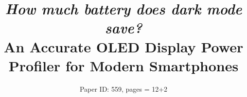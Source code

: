 \documentclass{sig-alternate-10pt}
\begin{document}
\title{
  {\it \LARGE How much battery does dark mode save?}\\
    An Accurate OLED Display Power Profiler
    for Modern Smartphones}



\author{
Paper ID: 559, pages = 12+2
} 


\newcommand{\oldstuff}[1]{}
\newcommand{\yes}{$\checkmark$}
\newcommand{\limited}{Limited}
\newcommand{\no}{$\times$}
\newcommand{\etc}{\emph{etc.}\xspace}
\newcommand{\etcc}{\emph{etc.}}
\newcommand{\ie}{\emph{i.e.,}\xspace}
\newcommand{\eg}{\emph{e.g.,}\xspace}
\newcommand{\etal}{\emph{et al.}\xspace}
\newcommand{\SmallCrunch}{\vspace{-0cm}}
\newcommand{\smallcrunch}{\vspace{-0cm}}

\renewcommand{\paragraph}[1]{\smallskip\noindent{\bf{#1}}}


\newcommand{\questionaj}[1]{{\color{red} \textbf{questionAJ: #1}}}
\newcommand{\updated}[1]{{\color{red} {}}}
\newcommand{\editaj}[2]{{\sout{#1}\color{red} {#2}}}
\newcommand{\removeaj}[2]{{\color{red}{\textbf{Remove following:}}}{\sout{#1}}	{\color{red} {\textbf{Because} #2}}}
\newcommand{\addaj}[1]{{\color{red} {ADD?: #1}}}

\newcommand{\insitu}{{\em in situ}\xspace}

\newcommand{\name}{{\sc PFOP}\xspace}
\newcommand{\namee}{{\sc PFOP}}
\newcommand{\ychurm}[1]{{\hspace{-0.2cm}}}

\newcommand{\panic}[1]{\vspace{-#1 plus 1pt minus 1pt}}
\newcommand{\panictwo}[1]{\vspace{-#1 plus 2pt minus 2pt}}

\newcommand{\appwithlink}[0]{\href{https://play.google.com/store/apps/details?id=com.pdeveloper.pcav5}{~\name~}}
\end{document}
